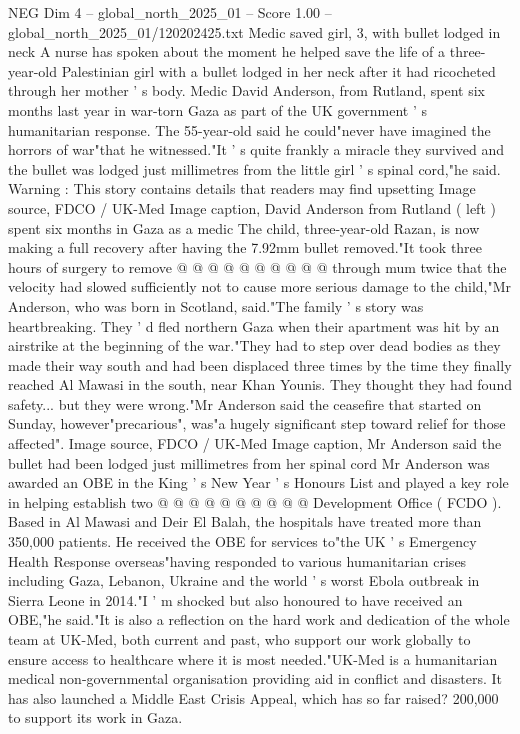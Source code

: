 \begin{textsample}{NEG Dim 4 – global\_north\_2025\_01 – Score 1.00 – global\_north\_2025\_01/120202425.txt}  \label{ex:f4_neg_420}
Medic saved girl, 3, with bullet lodged in neck A nurse has spoken about the moment he helped save the life of a three-year-old Palestinian girl with a bullet lodged in her neck after it had ricocheted through her mother ' s body.
Medic David Anderson, from Rutland, spent six months last year in war-torn Gaza as part of the UK government ' s humanitarian response.
The 55-year-old said he could"never have imagined the horrors of war"that he witnessed."It ' s quite frankly a miracle they survived and the bullet was lodged just millimetres from the little girl ' s spinal cord,"he said.
Warning : This story contains details that readers may find upsetting Image source, FDCO / UK-Med Image caption, David Anderson from Rutland ( left ) spent six months in Gaza as a medic The child, three-year-old Razan, is now making a full recovery after having the 7.92mm bullet removed."It took three hours of surgery to remove @ @ @ @ @ @ @ @ @ @ through mum twice that the velocity had slowed sufficiently not to cause more serious damage to the child,"Mr Anderson, who was born in Scotland, said."The family ' s story was heartbreaking.
They ' d fled northern Gaza when their apartment was hit by an airstrike at the beginning of the war."They had to step over dead bodies as they made their way south and had been displaced three times by the time they finally reached Al Mawasi in the south, near Khan Younis.
They thought they had found safety... but they were wrong."Mr Anderson said the ceasefire that started on Sunday, however"precarious", was"a hugely significant step toward relief for those affected".
Image source, FDCO / UK-Med Image caption, Mr Anderson said the bullet had been lodged just millimetres from her spinal cord Mr Anderson was awarded an OBE in the King ' s New Year ' s Honours List and played a key role in helping establish two @ @ @ @ @ @ @ @ @ @ Development Office ( FCDO ).
Based in Al Mawasi and Deir El Balah, the hospitals have treated more than 350,000 patients.
He received the OBE for services to"the UK ' s Emergency Health Response overseas"having responded to various humanitarian crises including Gaza, Lebanon, Ukraine and the world ' s worst Ebola outbreak in Sierra Leone in 2014."I ' m shocked but also honoured to have received an OBE,"he said."It is also a reflection on the hard work and dedication of the whole team at UK-Med, both current and past, who support our work globally to ensure access to healthcare where it is most needed."UK-Med is a humanitarian medical non-governmental organisation providing aid in conflict and disasters.
It has also launched a Middle East Crisis Appeal, which has so far raised? 200,000 to support its work in Gaza.

\end{textsample}
